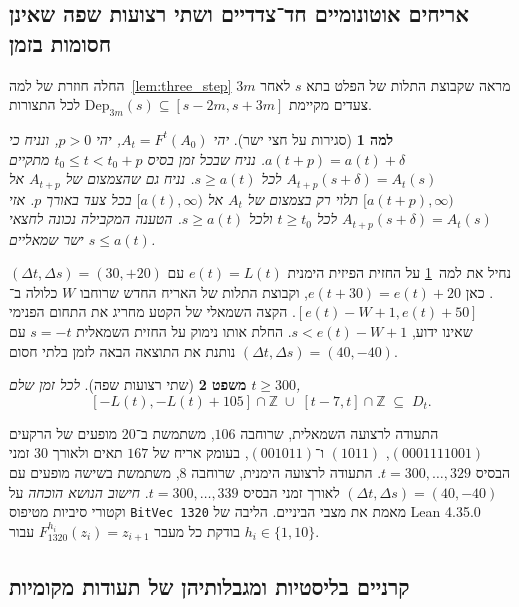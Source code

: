 \documentclass[11pt,a4paper]{article}
\DeclareRobustCommand{\textenglish}[1]{\foreignlanguage{english}{#1}}
\newtheorem{theorem}{משפט}[section]
\newtheorem{lemma}[theorem]{למה}
\theoremstyle{definition}
\begin{document}
\subsection{אריחים אוטונומיים חד־צדדיים ושתי רצועות שפה שאינן חסומות בזמן}\label{app:half-ray-tiles}

החלה חוזרת של למה~\ref{lem:three_step} מראה שקבוצת התלות של הפלט בתא $s$ לאחר $3m$ צעדים מקיימת $\mathrm{Dep}_{3m}(s) \subseteq [s - 2m, s + 3m]$ לכל התצורות.

\begin{lemma}[סגירות על חצי ישר]\label{lem:one_sided}
יהי $A_t = F^t(A_0)$, יהי $p > 0$, ונניח כי $a(t + p) = a(t) + \delta$. נניח שבכל זמן בסיס $t_0 \le t < t_0 + p$ מתקיים $A_{t+p}(s + \delta) = A_t(s)$ לכל $s \ge a(t)$. נניח גם שהצמצום של $A_{t+p}$ אל $[a(t+p), \infty)$ תלוי רק בצמצום של $A_t$ אל $[a(t), \infty)$ בכל צעד באורך $p$. אזי $A_{t+p}(s + \delta) = A_t(s)$ לכל $t \ge t_0$ ולכל $s \ge a(t)$. הטענה המקבילה נכונה לחצאי ישר שמאליים $s \le a(t)$.
\end{lemma}

נחיל את למה~\ref{lem:one_sided} על החזית הפיזית הימנית $e(t) = L(t)$ עם $(\Delta t, \Delta s) = (30, +20)$. כאן $e(t+30) = e(t) + 20$, וקבוצת התלות של האריח החדש שרוחבו $W$ כלולה ב־$[e(t) - W + 1, e(t) + 50]$. הקצה השמאלי של הקטע מחריג את התחום הפנימי שאינו ידוע, $s < e(t) - W + 1$. החלת אותו נימוק על החזית השמאלית $s = -t$ עם $(\Delta t, \Delta s) = (40,-40)$ נותנת את התוצאה הבאה לזמן בלתי חסום.

\begin{theorem}[שתי רצועות שפה]\label{thm:dual_strips}
לכל זמן שלם $t \ge 300$,
\begin{equation}\label{eq:dual_strips}
[-L(t), -L(t) + 105] \cap \mathbb{Z} \;\cup\; [t - 7, t] \cap \mathbb{Z} \;\subseteq\; D_t.
\end{equation}
\end{theorem}

התעודה לרצועה השמאלית, שרוחבה $106$, משתמשת ב־$20$ מופעים של הרקעים $(0001111001)$, $(1011)$ ו־$(001011)$, בעומק אריח של $167$ תאים ולאורך $30$ זמני הבסיס $t = 300, \dots, 329$. התעודה לרצועה הימנית, שרוחבה $8$, משתמשת בשישה מופעים עם $(\Delta t, \Delta s) = (40,-40)$ לאורך זמני הבסיס $t = 300, \dots, 339$. \emph{חישוב הנושא הוכחה} על וקטורי סיביות מטיפוס \textenglish{\texttt{BitVec 1320}} מאמת את מצבי הביניים. הליבה של \textenglish{Lean 4.35.0} בודקת כל מעבר $F_{1320}^{h_i}(z_i) = z_{i+1}$ עבור $h_i \in \{1, 10\}$.

\subsection{קרניים בליסטיות ומגבלותיהן של תעודות מקומיות}
\end{document}

